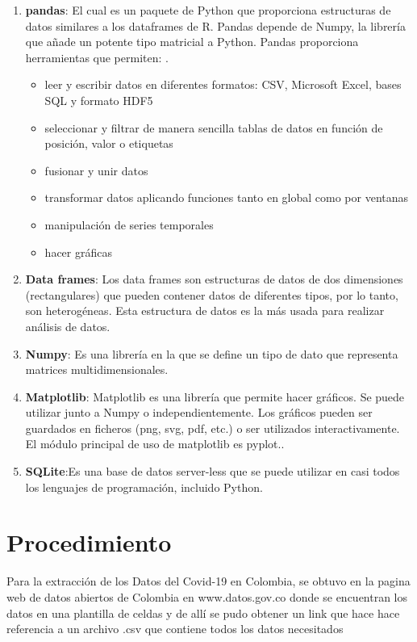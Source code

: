 \documentclass[conference,compsoc,onecolumn]{IEEEtran}
\begin{document}
\begin{enumerate}
    \item \textbf{pandas}: El cual es un paquete de Python que proporciona estructuras de datos similares a los dataframes de R. Pandas depende de Numpy, la librería que añade un potente tipo matricial a Python.
    Pandas proporciona herramientas que permiten:
    \cite{Pandas}.
    \begin{itemize}
        \item leer y escribir datos en diferentes formatos: CSV, Microsoft Excel, bases SQL y formato HDF5
        \item seleccionar y filtrar de manera sencilla tablas de datos en función de posición, valor o etiquetas
        \item fusionar y unir datos
        \item transformar datos aplicando funciones tanto en global como por ventanas
        \item manipulación de series temporales
        \item hacer gráficas
    \end{itemize}
    \item \textbf{Data frames}: Los data frames son estructuras de datos de dos dimensiones (rectangulares) que pueden contener datos de diferentes tipos, por lo tanto, son heterogéneas. Esta estructura de datos es la más usada para realizar análisis de datos\cite{Data}.
        \item \textbf{Numpy}: Es una librería en la que se define un tipo de dato que representa matrices multidimensionales\cite{Data2}.
    \item \textbf{Matplotlib}: Matplotlib es una librería que permite hacer gráficos. Se puede utilizar junto a Numpy o independientemente. Los gráficos pueden ser guardados en ficheros (png, svg, pdf, etc.) o ser utilizados interactivamente. El módulo principal de uso de matplotlib es pyplot\cite{Mat}..
    \item \textbf{SQLite}:Es una base de datos server-less que se puede utilizar en casi todos los lenguajes de programación, incluido Python\cite{SQL}.
\end{enumerate}


\section{Procedimiento}

   
    Para la extracción de los Datos del Covid-19 en Colombia, se obtuvo en la pagina web de datos abiertos de Colombia en www.datos.gov.co donde se encuentran los datos en una plantilla de celdas y de allí se pudo  obtener un link que hace hace referencia a un archivo .csv que contiene todos los datos necesitados
    
\end{document}
